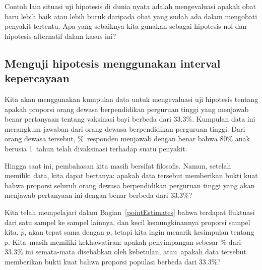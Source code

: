 \begin{exercisewrap}
\begin{nexercise}
  Contoh lain situasi uji hipotesis di dunia nyata
  adalah mengevaluasi apakah obat baru lebih baik atau lebih buruk
  daripada obat yang sudah ada dalam mengobati penyakit tertentu.
  Apa yang sebaiknya kita gunakan sebagai hipotesis nol dan hipotesis alternatif dalam
  kasus ini?\footnotemark{}
\end{nexercise}
\end{exercisewrap}


\subsection{Menguji hipotesis menggunakan interval kepercayaan}
\label{utilizingOurCI}

Kita akan menggunakan kumpulan data 
untuk mengevaluasi
uji hipotesis tentang apakah proporsi orang dewasa berpendidikan perguruan tinggi
yang menjawab benar pertanyaan tentang vaksinasi bayi berbeda
dari 33.3\%.
Kumpulan data ini merangkum jawaban dari \roslingAsize{}
orang dewasa berpendidikan perguruan tinggi.
Dari \roslingAsize{} orang dewasa tersebut, \roslingApercent{}\%~responden
menjawab dengan benar bahwa 80\% anak berusia 1~tahun
telah divaksinasi terhadap suatu penyakit.

Hingga saat ini, pembahasan kita masih bersifat filosofis.
Namun, setelah memiliki data, kita dapat bertanya:
apakah data tersebut memberikan bukti kuat bahwa proporsi
seluruh orang dewasa berpendidikan perguruan tinggi yang akan menjawab
pertanyaan ini dengan benar berbeda dari 33.3\%?

Kita telah mempelajari dalam Bagian~\ref{pointEstimates} bahwa terdapat
fluktuasi dari satu sampel ke sampel lainnya, dan kecil kemungkinannya
proporsi sampel kita, $\hat{p}$,
akan tepat sama dengan $p$, tetapi kita ingin menarik
kesimpulan tentang~$p$.
Kita~masih memiliki kekhawatiran:
apakah penyimpangan sebesar \roslingApercent{}\%
dari 33.3\% ini semata-mata disebabkan oleh kebetulan,
atau~apakah data tersebut memberikan bukti kuat bahwa
proporsi populasi berbeda dari 33.3\%?

